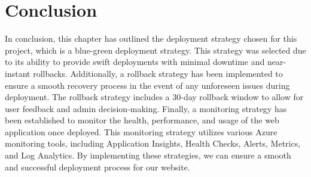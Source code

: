 \section*{Conclusion}
In conclusion, this chapter has outlined the deployment strategy chosen for this project, which is a blue-green deployment strategy. This strategy was selected due to its ability to provide swift deployments with minimal downtime and near-instant rollbacks. Additionally, a rollback strategy has been implemented to ensure a smooth recovery process in the event of any unforeseen issues during deployment. The rollback strategy includes a 30-day rollback window to allow for user feedback and admin decision-making. Finally, a monitoring strategy has been established to monitor the health, performance, and usage of the web application once deployed. This monitoring strategy utilizes various Azure monitoring tools, including Application Insights, Health Checks, Alerts, Metrics, and Log Analytics. By implementing these strategies, we can ensure a smooth and successful deployment process for our website.
